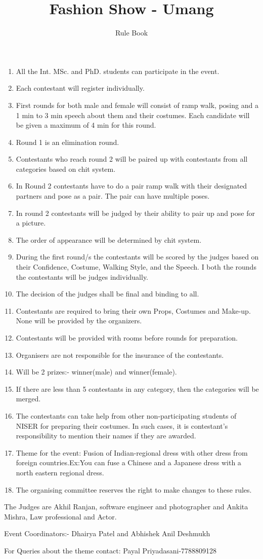 \documentclass[a4paper, 11pt]{proc}
\begin{document}
\title{Fashion Show - Umang}
\author{Rule Book}
\maketitle
\begin{enumerate}
	\item All the Int. MSc. and PhD. students can participate in the event.
	\item Each contestant will register individually.
	\item First rounds for both male and female will consist of ramp walk, posing and a 1 min to 3 min speech about them and their costumes. Each candidate will be given a maximum of 4 min for this round.
	\item Round 1 is an elimination round.
	\item Contestants who reach round 2 will be paired up with contestants from all categories based on chit system.
	\item In Round 2 contestants have to do a pair ramp walk with their designated partners and pose as a pair. The pair can have multiple poses.
	\item In round 2 contestants will be judged by their ability to pair up and pose for a picture.
	\item The order of appearance will be determined by chit system.
	\item During the first round/s the contestants will be scored by the judges based on their Confidence, Costume, Walking Style, and the Speech. I both the rounds the contestants will be judges individually.
	\item The decision of the judges shall be final and binding to all.
	\item Contestants are required to bring their own Props, Costumes and Make-up. None will be provided by the organizers.
	\item Contestants will be provided with rooms before rounds for preparation.
	\item Organisers are not responsible for the insurance of the contestants.
	\item Will be 2 prizes:- winner(male) and winner(female).
	\item If there are less than 5 contestants in any category, then the categories will be merged.
	\item The contestants can take help from other non-participating students of NISER for preparing their costumes. In such cases, it is contestant's responsibility to mention their names if they are awarded.
	\item Theme for the event: Fusion of Indian-regional dress with other dress from foreign countries.Ex:You can fuse a Chinese and a Japanese dress with a north eastern regional dress.
	\item The organising committee reserves the right to make changes to these rules.
\end{enumerate}
The Judges are Akhil Ranjan, software engineer and photographer and Ankita Mishra, Law professional and Actor.

Event Coordinators:- Dhairya Patel and Abhishek Anil Deshmukh

For Queries about the theme contact: Payal Priyadasani-7788809128
\end{document}
